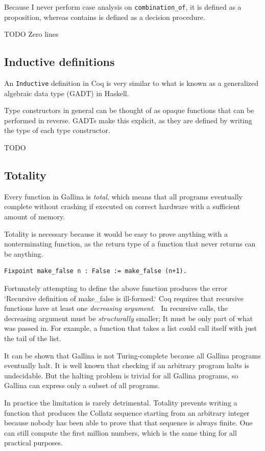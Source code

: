 \documentclass[english, 12pt, a4paper, sci, a-1b, online]{aaltothesis}
\newcommand\icoq[1]{\texttt{#1}}
\begin{document}
Because I never perform case analysis on \icoq{combination_of}, it is defined as a proposition, whereas contains is defined as a decision procedure.

TODO Zero lines

\subsection{Inductive definitions}

An \icoq{Inductive} definition in Coq is very similar to what is known as a generalized algebraic data type (GADT) in Haskell.

Type constructors in general can be thought of as opaque functions that can be performed in reverse. GADTs make this explicit, as they are defined by writing the type of each type constructor.

TODO

\subsection{Totality}\label{totality}

Every function in Gallina is \emph{total}, which means that all programs eventually complete without crashing if executed on correct hardware with a sufficient amount of memory.

Totality is necessary because it would be easy to prove anything with a nonterminating function, as the return type of a function that never returns can be anything.
\begin{verbatim}
Fixpoint make_false n : False := make_false (n+1).
\end{verbatim}
Fortunately attempting to define the above function produces the error `Recursive definition of make\_false is ill-formed.` Coq requires that recursive functions have at least one \emph{decreasing argument}.~\cite{coqRefman} In recursive calls, the decreasing argument must be \emph{structurally} smaller; It must be only part of what was passed in. For example, a function that takes a list could call itself with just the tail of the list.

It can be shown that Gallina is not Turing-complete because all Gallina programs eventually halt. It is well known that checking if an arbitrary program halts is undecidable. But the halting problem is trivial for all Gallina programs, so Gallina can express only a subset of all programs.

In practice the limitation is rarely detrimental. Totality prevents writing a function that produces the Collatz sequence starting from an arbitrary integer because nobody has been able to prove that that sequence is always finite. One can still compute the first million numbers, which is the same thing for all practical purposes.
\end{document}
